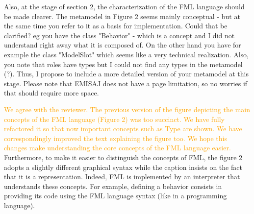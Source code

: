 \documentclass[10pt]{article}
\begin{document}
\begin{response}
%
%
%
%
%
%
%
%
%

\end{response}

\begin{response}{Also, at the stage of section 2, the characterization of the FML language should be made clearer. The metamodel in Figure 2 seems mainly conceptual - but at the same time you refer to it as a basis for implementation. Could that be clarified? eg you have the class "Behavior" - which is a concept and I did not understand right away what it is composed of. On the other hand you have for example the class "ModelSlot" which seems like a very technical realization. Also, you note that roles have types but I could not find any types in the metamodel (?). Thus, I propose to include a more detailed version of your metamodel at this stage. Please note that EMISAJ does not have a page limitation, so no worries if that should require more space.}

\textcolor{orange}{We agree with the reviewer. The previous version of the figure depicting the main concepts of the FML language (Figure 2) was too succinct. We have fully refactored it so that now important concepts such as \textsf{Type} are shown. We have correspondingly improved the text explaining the figure too. We hope this changes make understanding the core concepts of the FML language easier.}
{\color{teal} Furthermore, to make it easier to distinguish the concepts of FML, the figure 2 adopts a slightly different graphical syntax while the caption insists on the fact that it is a representation. Indeed, FML is implemented by an interpreter that understands these concepts. For example, defining a behavior consists in providing its code using the FML language syntax (like in a programming language).}


\end{response}
\end{document}
